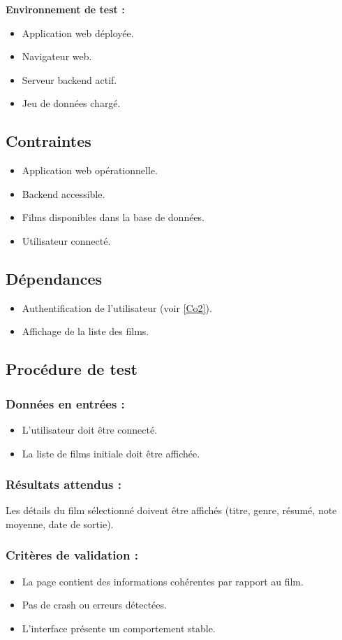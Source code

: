 \documentclass[a4paper,12pt]{report}
\begin{document}
\textbf{Environnement de test :}
\begin{itemize}
    \item Application web déployée.
    \item Navigateur web.
    \item Serveur backend actif.
    \item Jeu de données chargé.
\end{itemize}
\subsection*{Contraintes}
\begin{itemize}
    \item Application web opérationnelle.
    \item Backend accessible.
    \item Films disponibles dans la base de données.
    \item Utilisateur connecté.
\end{itemize}
\subsection*{Dépendances}
\begin{itemize}
    \item Authentification de l'utilisateur (voir \ref{Co2}).
    \item Affichage de la liste des films.
\end{itemize}
\subsection*{Procédure de test}
\subsubsection{Données en entrées :}
\begin{itemize}
    \item L'utilisateur doit être connecté.
    \item La liste de films initiale doit être affichée.
\end{itemize}

\subsubsection{Résultats attendus :}
Les détails du film sélectionné doivent être affichés (titre, genre, résumé, note moyenne, date de sortie).
\subsubsection{Critères de validation :}
\begin{itemize}
    \item La page contient des informations cohérentes par rapport au film.
    \item Pas de crash ou erreurs détectées.
    \item L'interface présente un comportement stable.
\end{itemize}
\newpage
\end{document}
